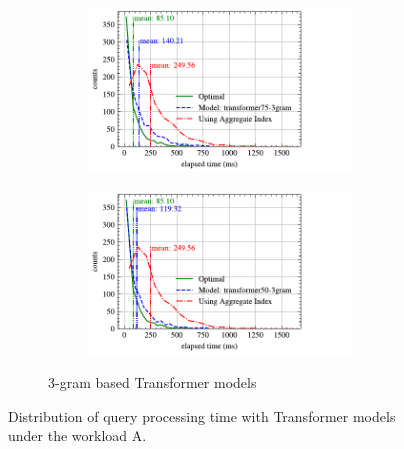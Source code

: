 \documentclass[conference]{IEEEtran}
\begin{document}
\begin{figure}[p]
\begin{subfigure}{0.45\textwidth}
\begin{subfigure}{\textwidth}
			\includegraphics[]{graphics/perf_dist_transformer75_3gram_A.pdf}
		\end{subfigure}
		\vfill
		\begin{subfigure}{\textwidth}
			\centering
			\includegraphics[]{graphics/perf_dist_transformer50_3gram_A.pdf}
		\end{subfigure}
		\caption{3-gram based Transformer models}
	\end{subfigure}
	\caption{Distribution of query processing time with Transformer models under the workload A.}
	\label{fig:transformer_perf_all_A}
\end{figure}
\end{document}
